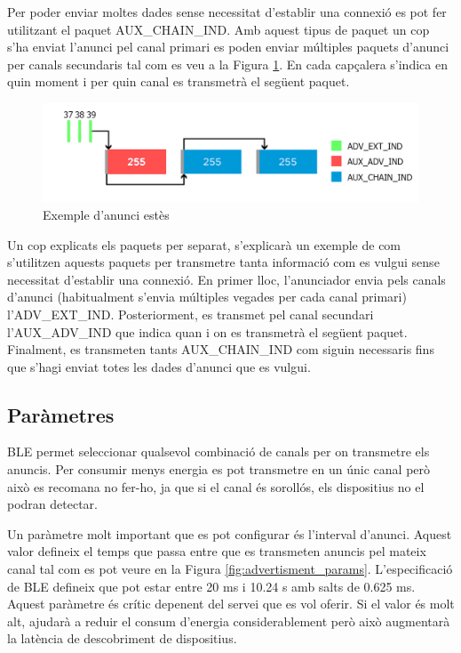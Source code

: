 Per poder enviar moltes dades sense necessitat d'establir una connexió es pot fer utilitzant el paquet AUX\_CHAIN\_IND.
Amb aquest tipus de paquet un cop s'ha enviat l'anunci pel canal primari es poden enviar múltiples paquets d'anunci per canals secundaris tal com es veu a la Figura \ref{fig:aux_chain_ind}.
En cada capçalera s'indica en quin moment i per quin canal es transmetrà el següent paquet.

\begin{figure}[h!]
	\begin{center}
		\includegraphics[width=1\textwidth]{./images/aux_chain_ind.png}
		\caption{Exemple d'anunci estès \cite{adv_ext}}
		\label{fig:aux_chain_ind}
	\end{center}
\end{figure}

Un cop explicats els paquets per separat, s'explicarà un exemple de com s'utilitzen aquests paquets per transmetre tanta informació com es vulgui sense necessitat d'establir una connexió.
En primer lloc, l'anunciador envia pels canals d'anunci (habitualment s'envia múltiples vegades per cada canal primari) l'ADV\_EXT\_IND.
Posteriorment, es transmet pel canal secundari l'AUX\_ADV\_IND que indica quan i on es transmetrà el següent paquet.
Finalment, es transmeten tants AUX\_CHAIN\_IND com siguin necessaris fins que s'hagi enviat totes les dades d'anunci que es vulgui.


\subsection{Paràmetres}
BLE permet seleccionar qualsevol combinació de canals per on transmetre els anuncis.
Per consumir menys energia es pot transmetre en un únic canal però això es recomana no fer-ho, ja que si el canal és sorollós, els dispositius no el podran detectar.

Un paràmetre molt important que es pot configurar és l'interval d'anunci.
Aquest valor defineix el temps que passa entre que es transmeten anuncis pel mateix canal tal com es pot veure en la Figura \ref{fig:advertisment_params}.
L'especificació de BLE defineix que pot estar entre 20 ms i 10.24 s amb salts de 0.625 ms.
Aquest paràmetre és crític depenent del servei que es vol oferir.
Si el valor és molt alt, ajudarà a reduir el consum d'energia considerablement però això augmentarà la latència de descobriment de dispositius.

